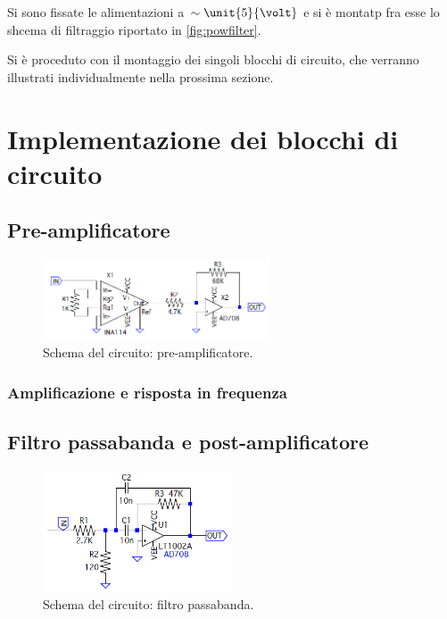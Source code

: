 \documentclass[a4paper,10pt]{article}
\begin{document}
Si sono fissate le alimentazioni a $\sim \unit{5}{\volt}$ e si è montatp fra esse lo shcema di filtraggio riportato in  \cref{fig:powfilter}.

Si è proceduto con il montaggio dei singoli blocchi di circuito, che verranno illustrati individualmente nella prossima sezione.


\section{Implementazione dei blocchi di circuito}

\subsection{Pre-amplificatore}

\begin{figure}
	\vspace{-10pt}
	\centering
	\includegraphics[width=0.6\textwidth]{../grafici/PreAmp.png}
	\vspace{-12pt}
	\caption{Schema del circuito: pre-amplificatore.}
	\label{fig:powamp}
	\vspace{-6pt}
\end{figure}

\lipsum[2-3]

\subsubsection*{Amplificazione e risposta in frequenza}

\lipsum[4]

\subsection{Filtro passabanda e post-amplificatore}

\begin{figure}
	\vspace{-10pt}
	\centering
	\includegraphics[width=0.5\textwidth]{../grafici/Bandpass.png}
	\vspace{-12pt}
	\caption{Schema del circuito: filtro passabanda.}
	\label{fig:powamp}
	\vspace{-6pt}
\end{figure}
\end{document}
